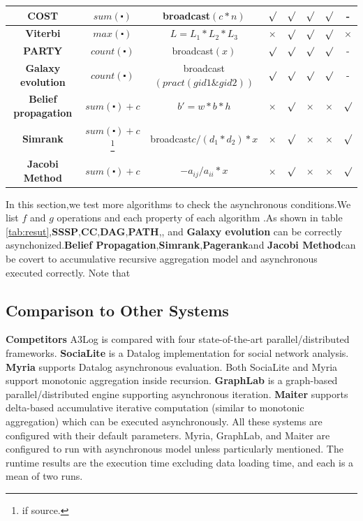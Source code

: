 \begin{table}[!t]
\begin{tabular}{c|c|c|c|c|c|c|c}
		\hline
		\textbf{COST} & $sum(\centerdot)$&broadcast$(c*n)$ & $\surd$ & $\surd$ & $\surd$ & $\surd$ & -\\
		\hline
		\textbf{Viterbi} & $max(\centerdot)$ & $L=L_1*L_2*L_3$ & $\times$ & $\surd$ &  $\surd$ &  $\surd$&$\times$\\
		\hline
		\textbf{PARTY} & $count(\centerdot)$&broadcast$(x)$ & $\surd$ & $\surd$ & $\surd$ & $\surd$ & -\\
		\hline
		\textbf{Galaxy evolution} & $count(\centerdot)$ &broadcast$(pract(gid1\& gid2))$ & $\surd$ & $\surd$ & $\surd$ & $\surd$ & -\\
		\hline
		\textbf{Belief propagation} & $sum(\centerdot)+c$ &$b'=w*b*h$ & $\times$ & $\surd$ & $\times$ & $\times$& $\surd$\\
		\hline
		\textbf{Simrank} & $sum(\centerdot)+c$\footnote{if source.}& broadcast$c/(d_1*d_2)*x$ & $\times$ &  $\surd$ &  $\times$ &  $\times$& $\surd$\\
		\hline
		\textbf{Jacobi Method} &$sum(\centerdot)+c$ &$-a_{ij}/a_{ii}*x$& $\times$ & $\surd$  & $\times$ & $\times$ & $\surd$\\
		\hline
		\hline
	\end{tabular}
	\vspace{-0.1in}
\end{table}

In this section,we test more algorithms to check the asynchronous conditions.We list $f$ and $g$ operations and each property of each algorithm .As shown in table \ref{tab:resut},\textbf{SSSP},\textbf{CC},\textbf{DAG},\textbf{PATH},, and \textbf{Galaxy evolution} can be correctly asynchonized.\textbf{Belief Propagation},\textbf{Simrank},\textbf{Pagerank}and \textbf{Jacobi Method}can be covert to accumulative recursive aggregation model and asynchronous executed correctly. Note that 


\subsection{Comparison to Other Systems}
\label{sec:expr:othersystems}

\noindent\textbf{Competitors}
A3Log is compared with four state-of-the-art parallel/distributed frameworks. \textbf{SociaLite} \cite{Lam:2013:SDE:2510649.2511289,Seo:2013:DSD:2556549.2556572} is a Datalog implementation for social network analysis. \textbf{Myria} \cite{Halperin:2014:DMB:2588555.2594530,Wang:2015:AFR:2824032.2824052} supports Datalog asynchronous evaluation. Both SociaLite and Myria support monotonic aggregation inside recursion. \textbf{GraphLab} \cite{Low:2012:DGF:2212351.2212354} is a graph-based parallel/distributed engine supporting asynchronous iteration. \textbf{Maiter} \cite{maiter} supports delta-based accumulative iterative computation (similar to monotonic aggregation) which can be executed asynchronously. All these systems are configured with their default parameters. Myria, GraphLab, and Maiter are configured to run with asynchronous model unless particularly mentioned. The runtime results are the execution time excluding data loading time, and each is a mean of two runs.

